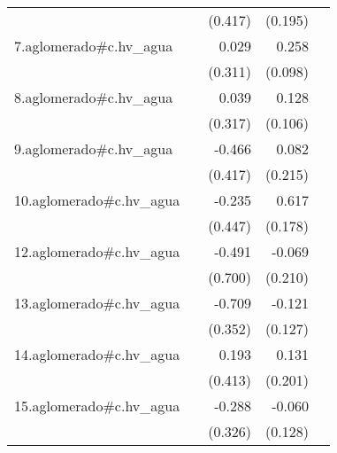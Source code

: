 {\begin{longtable}{l*{4}{D{.}{.}{-1}}}
            &                     &     (0.417)         &     (0.195)         &                     \\
\addlinespace
7.aglomerado#c.hv\_agua&                     &       0.029         &       0.258\sym{**} &                     \\
            &                     &     (0.311)         &     (0.098)         &                     \\
\addlinespace
8.aglomerado#c.hv\_agua&                     &       0.039         &       0.128         &                     \\
            &                     &     (0.317)         &     (0.106)         &                     \\
\addlinespace
9.aglomerado#c.hv\_agua&                     &      -0.466         &       0.082         &                     \\
            &                     &     (0.417)         &     (0.215)         &                     \\
\addlinespace
10.aglomerado#c.hv\_agua&                     &      -0.235         &       0.617\sym{***}&                     \\
            &                     &     (0.447)         &     (0.178)         &                     \\
\addlinespace
12.aglomerado#c.hv\_agua&                     &      -0.491         &      -0.069         &                     \\
            &                     &     (0.700)         &     (0.210)         &                     \\
\addlinespace
13.aglomerado#c.hv\_agua&                     &      -0.709\sym{*}  &      -0.121         &                     \\
            &                     &     (0.352)         &     (0.127)         &                     \\
\addlinespace
14.aglomerado#c.hv\_agua&                     &       0.193         &       0.131         &                     \\
            &                     &     (0.413)         &     (0.201)         &                     \\
\addlinespace
15.aglomerado#c.hv\_agua&                     &      -0.288         &      -0.060         &                     \\
            &                     &     (0.326)         &     (0.128)         &                     \\

\end{longtable}}

